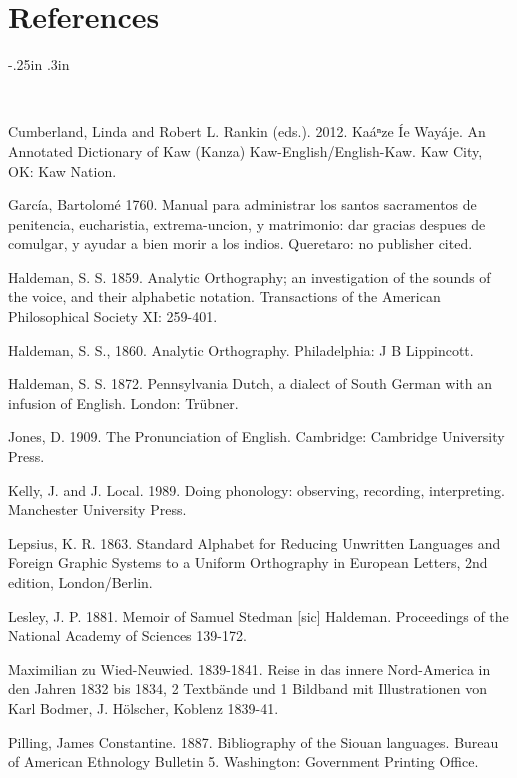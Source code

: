 \documentclass[output=paper]{LSP/langsci}
\begin{document}
\section*{References}

\newenvironment{reflist} {\begin{list} {} {\listparindent -.25in
\leftmargin .3in} \item \ \vspace{-.3in} } {\end{list} }

\begin{reflist}

Cumberland, Linda and Robert L. Rankin (eds.). 2012. Ka\'aⁿze \'Ie Way\'aje.  An Annotated Dictionary of Kaw (Kanza)  Kaw-English/English-Kaw.  Kaw City, OK: Kaw Nation.  

Garc\'ia, Bartolom\'e 1760.  Manual para administrar los santos sacramentos de penitencia, eucharistia, extrema-uncion, y matrimonio: dar gracias despues de comulgar, y ayudar a bien morir a los indios. Queretaro: no publisher cited. 

Haldeman, S. S. 1859. Analytic Orthography; an investigation of the sounds of the voice, and their alphabetic notation.  Transactions of the American Philosophical Society XI: 259-401.   

Haldeman, S. S., 1860.   Analytic Orthography.  Philadelphia: J B Lippincott.

Haldeman, S. S.  1872.  Pennsylvania Dutch, a dialect of South German with an infusion of English.  London: Tr\"ubner. 

Jones, D. 1909.  The Pronunciation of English.  Cambridge: Cambridge University Press.

Kelly, J. and J. Local. 1989.  Doing phonology: observing, recording, interpreting.  Manchester University Press. 

Lepsius, K. R. 1863. Standard Alphabet for Reducing Unwritten Languages and Foreign Graphic Systems to a Uniform Orthography in European Letters, 2nd edition, London/Berlin.  

Lesley, J. P. 1881.   Memoir of Samuel Stedman [sic] Haldeman.  Proceedings of the National Academy of Sciences 139-172.

Maximilian zu Wied-Neuwied. 1839-1841.  Reise in das innere Nord-America in den Jahren 1832 bis 1834, 2 Textb\"ande und 1 Bildband mit Illustrationen von Karl Bodmer, J. H\"olscher, Koblenz 1839-41.

Pilling, James Constantine. 1887.  Bibliography of the Siouan languages.  Bureau of American Ethnology Bulletin 5. Washington: Government Printing Office.


\end{reflist}
\end{document}
